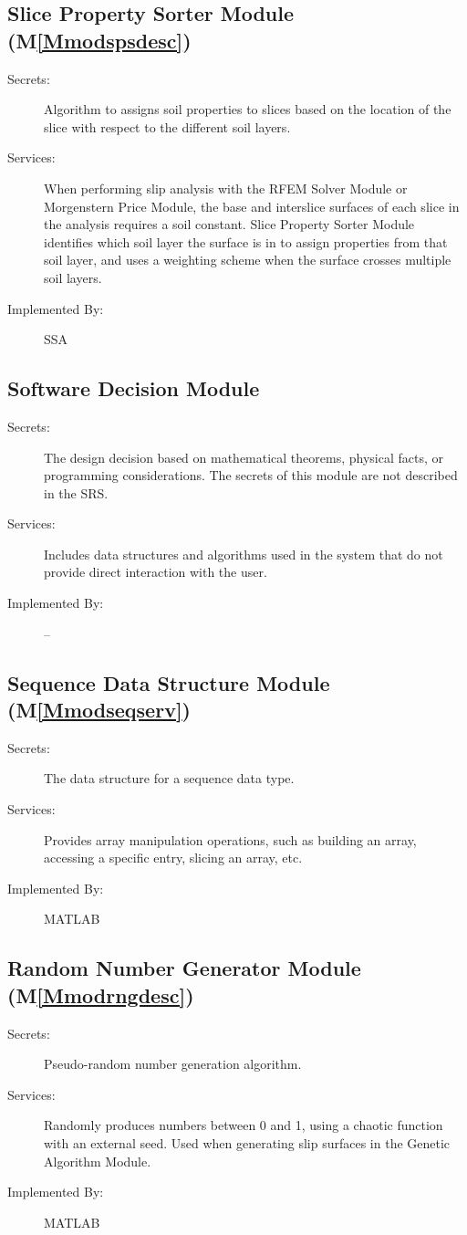 \documentclass[12pt]{article}
\begin{document}
\subsection{Slice Property Sorter Module (M\ref{Mmodspsdesc})}
\label{Sec:SlicPropSortModu()}
\begin{description}
\item[Secrets:]Algorithm to assigns soil properties to slices based on the location of the slice with respect to the different soil layers.
\item[Services:]When performing slip analysis with the RFEM Solver Module or Morgenstern Price Module, the base and interslice surfaces of each slice in the analysis requires a soil constant. Slice Property Sorter Module identifies which soil layer the surface is in to assign properties from that soil layer, and uses a weighting scheme when the surface crosses multiple soil layers.
\item[Implemented By:]SSA
\end{description}
\subsection{Software Decision Module}
\label{Sec:SoftDeciModu}
\begin{description}
\item[Secrets:]The design decision based on mathematical theorems, physical facts, or programming considerations. The secrets of this module are not described in the SRS.
\item[Services:]Includes data structures and algorithms used in the system that do not provide direct interaction with the user.
\item[Implemented By:]--
\end{description}
\subsection{Sequence Data Structure Module (M\ref{Mmodseqserv})}
\label{Sec:SequDataStruModu()}
\begin{description}
\item[Secrets:]The data structure for a sequence data type.
\item[Services:]Provides array manipulation operations, such as building an array, accessing a specific entry, slicing an array, etc.
\item[Implemented By:]MATLAB
\end{description}
\subsection{Random Number Generator Module (M\ref{Mmodrngdesc})}
\label{Sec:RandNumbGeneModu()}
\begin{description}
\item[Secrets:]Pseudo-random number generation algorithm.
\item[Services:]Randomly produces numbers between 0 and 1, using a chaotic function with an external seed. Used when generating slip surfaces in the Genetic Algorithm Module.
\item[Implemented By:]MATLAB
\end{description}
\end{document}
